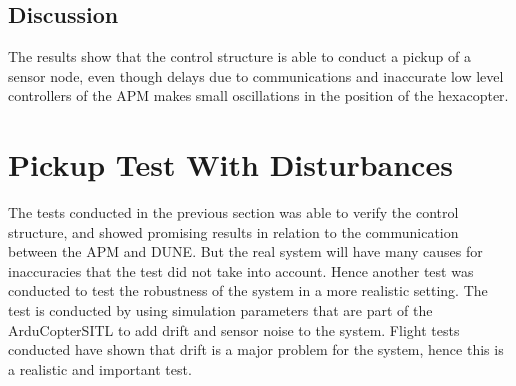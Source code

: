 \subsection{Discussion}
The results show that the control structure is able to conduct a pickup of a sensor node, even though delays due to communications and inaccurate low level controllers of the APM makes small oscillations in the position of the hexacopter.
\section{Pickup Test With Disturbances}
The tests conducted in the previous section was able to verify the control structure, and showed promising results in relation to the communication between the APM and DUNE. But the real system will have many causes for inaccuracies that the test did not take into account.  Hence another test was conducted to test the robustness of the system in a more realistic setting. The test is conducted by using simulation parameters that are part of the ArduCopterSITL to add drift and sensor noise to the system. Flight tests conducted have shown that drift is a major problem for the system, hence this is a realistic and important test.  
